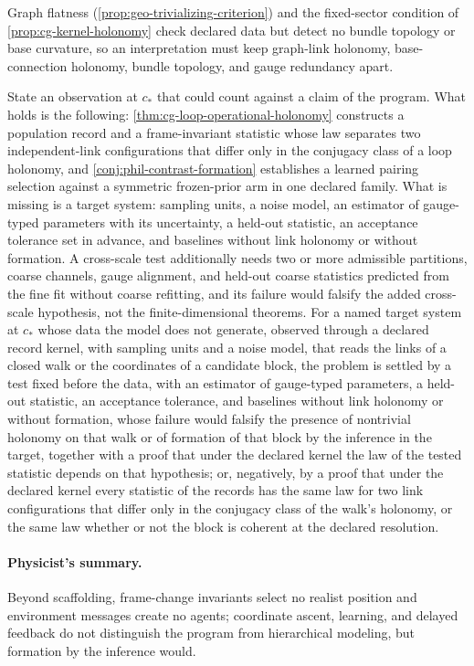 Graph flatness (\cref{prop:geo-trivializing-criterion}) and the fixed-sector
condition of \cref{prop:cg-kernel-holonomy} check declared data but detect no
bundle topology or base curvature, so an interpretation must keep graph-link
holonomy, base-connection holonomy, bundle topology, and gauge redundancy apart.

State an observation at \(c_*\) that could count against a claim of the program.
What holds is the following: \cref{thm:cg-loop-operational-holonomy} constructs a
population record and a frame-invariant statistic whose law separates two
independent-link configurations that differ only in the conjugacy class of a
loop holonomy, and \cref{conj:phil-contrast-formation} establishes a learned
pairing selection against a symmetric frozen-prior arm in one declared
family. What is missing is a
target system: sampling units, a noise model, an estimator of gauge-typed
parameters with its uncertainty, a held-out statistic, an acceptance tolerance
set in advance, and baselines without link holonomy or without formation. A
cross-scale test additionally needs two or more admissible partitions,
coarse channels, gauge alignment, and held-out coarse statistics predicted from
the fine fit without coarse refitting, and its failure would falsify the added
cross-scale hypothesis, not the finite-dimensional theorems. For a named
target system at \(c_*\) whose data the model does not generate, observed
through a declared record kernel, with sampling units and a noise model, that
reads the links of a closed walk or the coordinates of a candidate block, the
problem is settled by a test fixed before the data, with an estimator of
gauge-typed parameters, a held-out statistic, an acceptance tolerance, and
baselines without link holonomy or without formation, whose failure would
falsify the presence of nontrivial holonomy on that walk or of formation of
that block by the inference in the target, together with a proof that under
the declared kernel the law of the tested statistic depends on that
hypothesis; or, negatively, by a proof that under the declared kernel every
statistic of the records has the same law for two link configurations that
differ only in the conjugacy class of the walk's holonomy, or the same law
whether or not the block is coherent at the declared resolution.

\paragraph{Physicist's summary.}
Beyond scaffolding, frame-change invariants select no realist position and
environment messages create no agents; coordinate ascent, learning, and delayed
feedback do not distinguish the program from hierarchical modeling, but
formation by the inference would.
